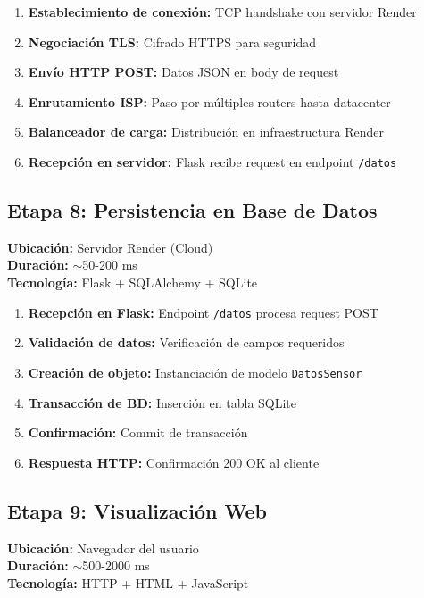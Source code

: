 \documentclass[12pt]{article}
\begin{document}
\begin{enumerate}
    \item \textbf{Establecimiento de conexión:} TCP handshake con servidor Render
    \item \textbf{Negociación TLS:} Cifrado HTTPS para seguridad
    \item \textbf{Envío HTTP POST:} Datos JSON en body de request
    \item \textbf{Enrutamiento ISP:} Paso por múltiples routers hasta datacenter
    \item \textbf{Balanceador de carga:} Distribución en infraestructura Render
    \item \textbf{Recepción en servidor:} Flask recibe request en endpoint \texttt{/datos}
\end{enumerate}

\subsection{Etapa 8: Persistencia en Base de Datos}
\textbf{Ubicación:} Servidor Render (Cloud)\\
\textbf{Duración:} $\sim$50-200 ms\\
\textbf{Tecnología:} Flask + SQLAlchemy + SQLite

\begin{enumerate}
    \item \textbf{Recepción en Flask:} Endpoint \texttt{/datos} procesa request POST
    \item \textbf{Validación de datos:} Verificación de campos requeridos
    \item \textbf{Creación de objeto:} Instanciación de modelo \texttt{DatosSensor}
    \item \textbf{Transacción de BD:} Inserción en tabla SQLite
    \item \textbf{Confirmación:} Commit de transacción
    \item \textbf{Respuesta HTTP:} Confirmación 200 OK al cliente
\end{enumerate}

\subsection{Etapa 9: Visualización Web}
\textbf{Ubicación:} Navegador del usuario\\
\textbf{Duración:} $\sim$500-2000 ms\\
\textbf{Tecnología:} HTTP + HTML + JavaScript
\end{document}
